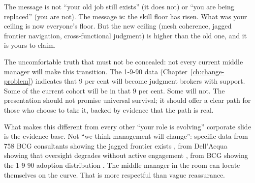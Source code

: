 \begin{keyinsight}
The message is not ``your old job still exists'' (it does not) or ``you are being replaced'' (you are not). The message is: the skill floor has risen. What was your ceiling is now everyone's floor. But the new ceiling (mesh coherence, jagged frontier navigation, cross-functional judgment) is higher than the old one, and it is yours to claim.

The uncomfortable truth that must not be concealed: not every current middle manager will make this transition. The 1-9-90 data (Chapter~\ref{ch:change-problem}) indicates that 9 per cent will become judgment brokers with support. Some of the current cohort will be in that 9 per cent. Some will not. The presentation should not promise universal survival; it should offer a clear path for those who choose to take it, backed by evidence that the path is real.
\end{keyinsight}

What makes this different from every other ``your role is evolving'' corporate slide is the evidence base. Not ``we think management will change'': specific data from 758 BCG consultants showing the jagged frontier exists \parencite{DellAcqua2026}, from Dell'Acqua showing that oversight degrades without active engagement \parencite{DellAcqua2023}, from BCG showing the 1-9-90 adoption distribution \parencite{BCGAgenticShift2025}. The middle manager in the room can locate themselves on the curve. That is more respectful than vague reassurance.

